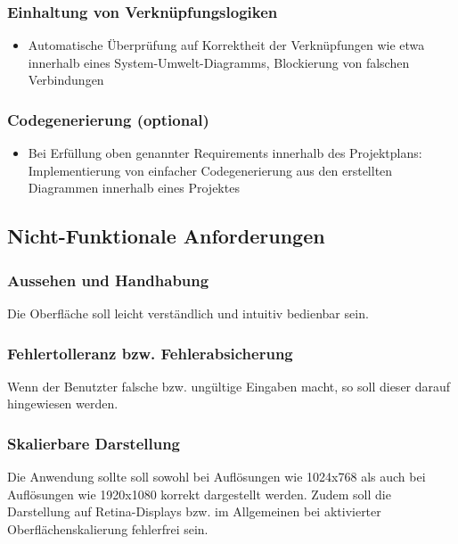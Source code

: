 \subsubsection{Einhaltung von Verknüpfungslogiken}
\begin{itemize}
	\item Automatische Überprüfung auf Korrektheit der Verknüpfungen wie etwa innerhalb eines System-Umwelt-Diagramms, Blockierung von falschen Verbindungen  
\end{itemize}

\subsubsection{Codegenerierung (optional)}
\begin{itemize}
	\item Bei Erfüllung oben genannter Requirements innerhalb des Projektplans: Implementierung von einfacher Codegenerierung aus den erstellten Diagrammen innerhalb eines Projektes
\end{itemize}
	
\subsection{Nicht-Funktionale Anforderungen}

\subsubsection{Aussehen und Handhabung}
Die Oberfläche soll leicht verständlich und intuitiv bedienbar sein.

\subsubsection{Fehlertolleranz bzw. Fehlerabsicherung}
Wenn der Benutzter falsche bzw. ungültige Eingaben macht, so soll dieser darauf hingewiesen werden.

\subsubsection{Skalierbare Darstellung}
Die Anwendung sollte soll sowohl bei Auflösungen wie 1024x768 als auch bei Auflösungen wie 1920x1080 korrekt
dargestellt werden. Zudem soll die Darstellung auf Retina-Displays bzw. im Allgemeinen bei aktivierter
Oberflächenskalierung fehlerfrei sein.
